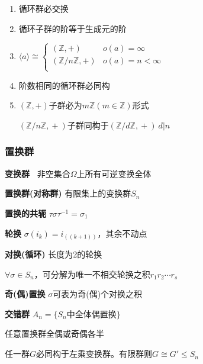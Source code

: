 \documentclass[b4paper, 10pt]{ctexart}
\newcommand*{\setZ}{\mathbb{Z}}
\renewcommand*{\leq}{\leqslant}
\newcommand*{\gengroup}[1]{\langle #1 \rangle}
\begin{document}
\begin{multicols}{3}
\begin{theorem}[循环群性质]
        \begin{enumerate}
            \item 循环群必交换
            \item 循环子群的阶等于生成元的阶
            \item $\gengroup{a} \cong \begin{cases}
                          (\setZ, +)        & o(a)=\infty       \\
                          (\setZ/n\setZ, +) & o(a) = n < \infty \\
                      \end{cases}$
            \item 阶数相同的循环群必同构
            \item $(\setZ, +)\!$子群必为$m\setZ(m \!\in\! \setZ)$形式

                  $(\setZ/n\setZ,\! +)\!$子群同构于$\!(\setZ/d\setZ,\! +)\  d|n$
        \end{enumerate}
    \end{theorem}

    \subsubsection{置换群}

    \textbf{变换群\ } 非空集合$\Omega$上所有可逆变换全体

    \textbf{置换群(对称群)} 有限集上的变换群$S_n$

    \textbf{置换的共轭} $\tau \sigma \tau^{-1} = \sigma_1$

    \textbf{轮换} $\sigma(i_k) = i_{((k+1))}$，其余不动点

    \textbf{对换(循环)} 长度为2的轮换

    \begin{theorem}[标准轮换分解]
        $\forall \sigma \in S_n$，可分解为唯一不相交轮换之积$r_1 r_2 \cdots r_s$
    \end{theorem}

    \textbf{奇(偶)置换} $\sigma$可表为奇(偶)个对换之积

    \textbf{交错群} $A_n = \{ S_n \text{中全体偶置换} \}$

    \begin{theorem}[置换群性质]
        任意置换群全偶或奇偶各半
    \end{theorem}

    \begin{theorem}[Cayley定理]
        任一群$G$必同构于左乘变换群。有限群则$G \!\cong\! G' \!\leq\! S_n$
    \end{theorem}


\end{multicols}
\end{document}
